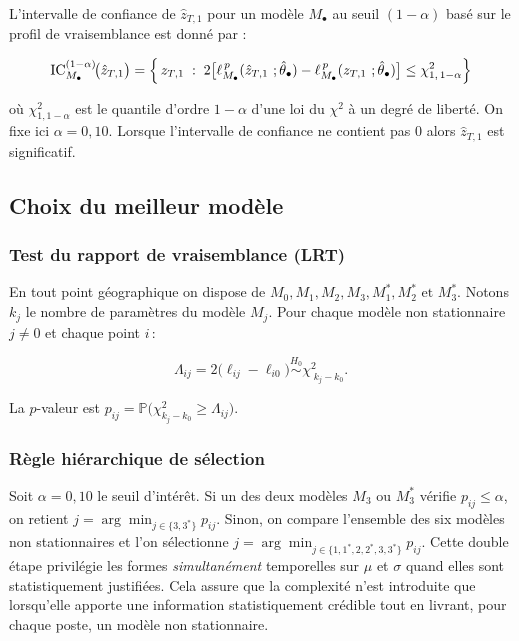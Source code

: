 \documentclass[
  article,
  nofooter,
  noheadings]{jss}
\begin{document}
L'intervalle de confiance de \(\hat{z}_{T,1}\) pour un modèle
\(M_\bullet\) au seuil \((1 - \alpha)\) basé sur le profil de
vraisemblance est donné par :

\[
\operatorname{IC}_{M_\bullet}^{(1-\alpha)}\!\bigl(\hat{z}_{T,1}\bigr)
   = \Bigl\{\, z_{T,1}\;:\;
        2\bigl[\ell_{M_\bullet}^{\,p}(\hat{z}_{T,1} \ ; \hat{\theta}_{\bullet})-\ell_{M_\bullet}^{\,p}(z_{T,1} \ ; \hat{\theta}_{\bullet})\bigr]
        \le \chi^{2}_{1,\,1-\alpha} \Bigr\}
\]

où \(\chi^2_{1,1-\alpha}\) est le quantile d'ordre \(1 - \alpha\) d'une
loi du \(\chi^2\) à un degré de liberté. On fixe ici \(\alpha=0{,}10\).
Lorsque l'intervalle de confiance ne contient pas 0 alors
\(\hat{z}_{T,1}\) est significatif.

\subsection{Choix du meilleur modèle}\label{choix-du-meilleur-moduxe8le}

\subsubsection{Test du rapport de vraisemblance
(LRT)}\label{test-du-rapport-de-vraisemblance-lrt}

En tout point géographique on dispose de
\(M_0, M_1, M_2, M_3, M_1^\ast, M_2^\ast \text{ et } M_3^\ast\). Notons
\(k_j\) le nombre de paramètres du modèle \(M_j\). Pour chaque modèle
non stationnaire \(j\neq 0\) et chaque point \(i\)\,:

\[
\Lambda_{ij}=2\bigl(\ell_{ij}-\ell_{i0}\bigr)
\overset{H_0}{\sim}\chi^{2}_{\;k_j-k_0}.
\]

La \(p\)-valeur est
\(p_{ij}= \mathbb{P}(\chi^{2}_{k_j-k_0}\ge \Lambda_{ij}\bigr)\).

\subsubsection{Règle hiérarchique de
sélection}\label{ruxe8gle-hiuxe9rarchique-de-suxe9lection}

Soit \(\alpha=0{,}10\) le seuil d'intérêt. Si un des deux modèles
\(M_3\) ou \(M_3^\ast\) vérifie \(p_{ij}\le\alpha\), on retient
\(j=\arg\min_{j\in\{3,3^\ast\}} p_{ij}\). Sinon, on compare l'ensemble
des six modèles non stationnaires et l'on sélectionne
\(j=\arg\min_{j\in\{1,1^\ast,2,2^\ast,3,3^\ast\}} p_{ij}\). Cette double
étape privilégie les formes \emph{simultanément} temporelles sur \(\mu\)
et \(\sigma\) quand elles sont statistiquement justifiées. Cela assure
que la complexité n'est introduite que lorsqu'elle apporte une
information statistiquement crédible tout en livrant, pour chaque poste,
un modèle non stationnaire.
\end{document}
